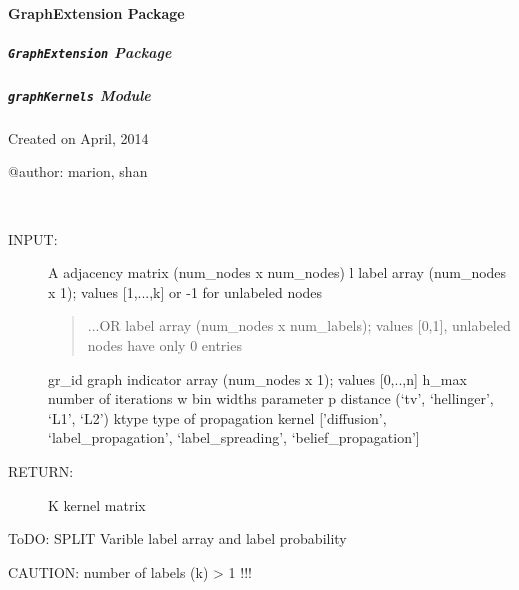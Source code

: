 \documentclass[letterpaper,10pt,english]{sphinxmanual}
\begin{document}
\paragraph{GraphExtension Package}
\label{pyGPs.GraphExtension:graphextension-package}\label{pyGPs.GraphExtension::doc}

\subparagraph{\texttt{GraphExtension} Package}
\label{pyGPs.GraphExtension:id1}\label{pyGPs.GraphExtension:module-pyGPs.GraphExtension}

\subparagraph{\texttt{graphKernels} Module}
\label{pyGPs.GraphExtension:graphkernels-module}\label{pyGPs.GraphExtension:module-pyGPs.GraphExtension.graphKernels}
Created on April, 2014

@author: marion, shan

\begin{fulllineitems}
\label{pyGPs.GraphExtension:pyGPs.GraphExtension.graphKernels.propagationKernel}~\begin{description}
\item[{INPUT: }] \leavevmode
A           adjacency matrix (num\_nodes x num\_nodes)
l           label array (num\_nodes x 1); values {[}1,...,k{]} or -1 for unlabeled nodes
\begin{quote}

...OR label array (num\_nodes x num\_labels); values {[}0,1{]}, unlabeled nodes have only 0 entries
\end{quote}

gr\_id       graph indicator array (num\_nodes x 1); values {[}0,..,n{]}
h\_max       number of iterations
w           bin widths parameter
p           distance (`tv', `hellinger', `L1', `L2')
ktype    type of propagation kernel {[}'diffusion', `label\_propagation', `label\_spreading', `belief\_propagation'{]}

\item[{RETURN:}] \leavevmode
K        kernel matrix

\end{description}

ToDO: SPLIT Varible label array and label probability

CAUTION: number of labels (k) \textgreater{} 1 !!!

\end{fulllineitems}
\end{document}
